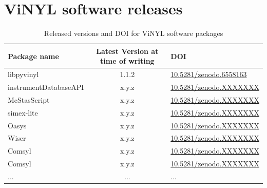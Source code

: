 \documentclass[11pt, a4paper]{article}
\begin{document}
  \appendix
  \section{ViNYL software releases}
  \begin{table}[ht]
    \centering
    \begin{tabular}[ht]{l|c|l}
      \textbf{Package name} & Latest Version at time of writing & DOI \\
      \hline
      libpyvinyl & 1.1.2 &  \href{https://doi.org/10.5281/zenodo.6558163}{10.5281/zenodo.6558163}\\
      instrumentDatabaseAPI & x.y.z &  \href{https://doi.org/10.5281/zenodo.XXXXXXX}{10.5281/zenodo.XXXXXXX}\\
      McStasScript & x.y.z &  \href{https://doi.org/10.5281/zenodo.XXXXXXX}{10.5281/zenodo.XXXXXXX}\\
      simex-lite & x.y.z &  \href{https://doi.org/10.5281/zenodo.XXXXXXX}{10.5281/zenodo.XXXXXXX}\\
      Oasys & x.y.z &  \href{https://doi.org/10.5281/zenodo.XXXXXXX}{10.5281/zenodo.XXXXXXX}\\
      Wiser & x.y.z &  \href{https://doi.org/10.5281/zenodo.XXXXXXX}{10.5281/zenodo.XXXXXXX}\\
      Comsyl & x.y.z &  \href{https://doi.org/10.5281/zenodo.XXXXXXX}{10.5281/zenodo.XXXXXXX}\\
      Comsyl & x.y.z &  \href{https://doi.org/10.5281/zenodo.XXXXXXX}{10.5281/zenodo.XXXXXXX}\\
      ... & ... & ...
    \end{tabular}
    \caption[ViNYL DOIs]{Released versions and DOI for ViNYL software packages}
    \label{tab:vinyl_releases}
  \end{table}
    



% 
% 
\printbibliography
\end{document}
